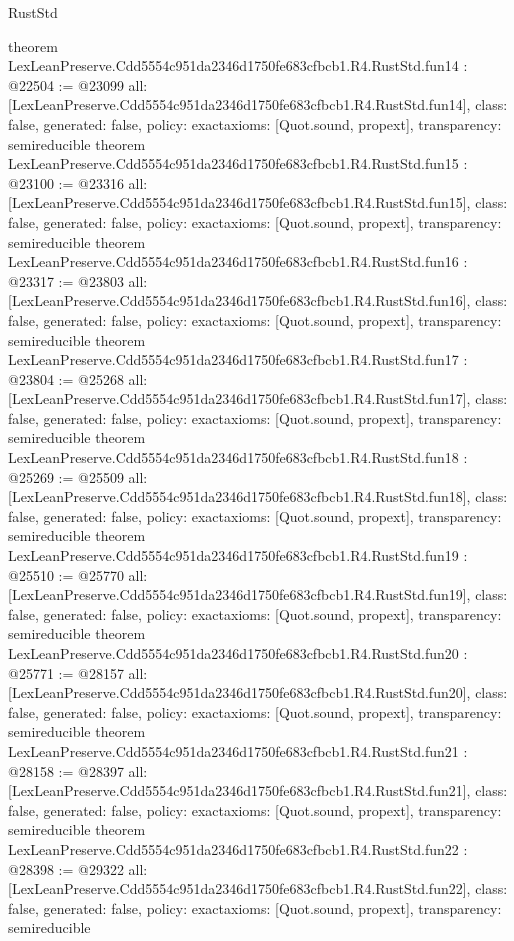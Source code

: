 \begin{lexlean}{RustStd}
\begin{coremodule}
{}
theorem LexLeanPreserve.Cdd5554c951da2346d1750fe683cfbcb1.R4.RustStd.fun14 : @22504 := @23099 {
  all: [LexLeanPreserve.Cdd5554c951da2346d1750fe683cfbcb1.R4.RustStd.fun14],
  class: false,
  generated: false,
  policy: exact{axioms: [Quot.sound, propext]},
  transparency: semireducible
}
theorem LexLeanPreserve.Cdd5554c951da2346d1750fe683cfbcb1.R4.RustStd.fun15 : @23100 := @23316 {
  all: [LexLeanPreserve.Cdd5554c951da2346d1750fe683cfbcb1.R4.RustStd.fun15],
  class: false,
  generated: false,
  policy: exact{axioms: [Quot.sound, propext]},
  transparency: semireducible
}
theorem LexLeanPreserve.Cdd5554c951da2346d1750fe683cfbcb1.R4.RustStd.fun16 : @23317 := @23803 {
  all: [LexLeanPreserve.Cdd5554c951da2346d1750fe683cfbcb1.R4.RustStd.fun16],
  class: false,
  generated: false,
  policy: exact{axioms: [Quot.sound, propext]},
  transparency: semireducible
}
theorem LexLeanPreserve.Cdd5554c951da2346d1750fe683cfbcb1.R4.RustStd.fun17 : @23804 := @25268 {
  all: [LexLeanPreserve.Cdd5554c951da2346d1750fe683cfbcb1.R4.RustStd.fun17],
  class: false,
  generated: false,
  policy: exact{axioms: [Quot.sound, propext]},
  transparency: semireducible
}
theorem LexLeanPreserve.Cdd5554c951da2346d1750fe683cfbcb1.R4.RustStd.fun18 : @25269 := @25509 {
  all: [LexLeanPreserve.Cdd5554c951da2346d1750fe683cfbcb1.R4.RustStd.fun18],
  class: false,
  generated: false,
  policy: exact{axioms: [Quot.sound, propext]},
  transparency: semireducible
}
theorem LexLeanPreserve.Cdd5554c951da2346d1750fe683cfbcb1.R4.RustStd.fun19 : @25510 := @25770 {
  all: [LexLeanPreserve.Cdd5554c951da2346d1750fe683cfbcb1.R4.RustStd.fun19],
  class: false,
  generated: false,
  policy: exact{axioms: [Quot.sound, propext]},
  transparency: semireducible
}
theorem LexLeanPreserve.Cdd5554c951da2346d1750fe683cfbcb1.R4.RustStd.fun20 : @25771 := @28157 {
  all: [LexLeanPreserve.Cdd5554c951da2346d1750fe683cfbcb1.R4.RustStd.fun20],
  class: false,
  generated: false,
  policy: exact{axioms: [Quot.sound, propext]},
  transparency: semireducible
}
theorem LexLeanPreserve.Cdd5554c951da2346d1750fe683cfbcb1.R4.RustStd.fun21 : @28158 := @28397 {
  all: [LexLeanPreserve.Cdd5554c951da2346d1750fe683cfbcb1.R4.RustStd.fun21],
  class: false,
  generated: false,
  policy: exact{axioms: [Quot.sound, propext]},
  transparency: semireducible
}
theorem LexLeanPreserve.Cdd5554c951da2346d1750fe683cfbcb1.R4.RustStd.fun22 : @28398 := @29322 {
  all: [LexLeanPreserve.Cdd5554c951da2346d1750fe683cfbcb1.R4.RustStd.fun22],
  class: false,
  generated: false,
  policy: exact{axioms: [Quot.sound, propext]},
  transparency: semireducible
}
\end{coremodule}
\end{lexlean}
